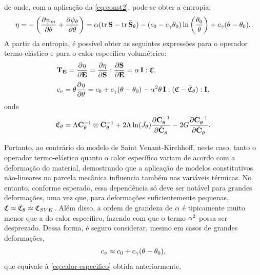 \documentclass[Tese.tex]{subfiles}
\begin{document}
de onde, com a aplicação da \cref{eq:const2}, pode-se obter a entropia:
\begin{equation}
\eta = -\left(\dfrac{\partial\psi_m}{\partial\theta} + \dfrac{\partial\psi_{\theta}}{\partial\theta}\right) = \alpha(\text{tr}\,\mathbf{S}-\text{tr}\,\bar{\mathbf{S}}_{\theta})-(c_0-c_{\gamma}\theta_0)\ln\left(\dfrac{\theta_0}{\theta}\right)+c_{\gamma}(\theta-\theta_0).
\end{equation}
A partir da entropia, é possível obter as seguintes expressões para o operador termo-elástico e para o calor específico volumétrico:
\begin{align}
&\operadorTermoElastico = \dfrac{\partial\entropy}{\partial\E} = \dfrac{\partial\entropy}{\partial\S}:\dfrac{\partial\S}{\partial\E} = \coefExp\,\I:\CC, \\[0.1cm]
&\volumetricHeatCapacity = \temp\dfrac{\partial\entropy}{\partial\temp} %
= \specificHeatIni+\specificHeatConst(\temp - \tempref) - \coefExp^2\temp\,\I:(\CC-\CCtNeg):\I.
\end{align}
onde
\begin{equation}
\bar{\mathfrak{C}}_{\theta} = \Lambda\bar{\mathbf{C}}_{\theta}^{-1}\otimes\bar{\mathbf{C}}_{\theta}^{-1}+2\Lambda\ln(\bar{J}_{\theta})\dfrac{\partial\bar{\mathbf{C}}_{\theta}^{-1}}{\partial\bar{\mathbf{C}}_{\theta}^{\;\;}} - 2G\dfrac{\partial\bar{\mathbf{C}}_{\theta}^{-1}}{\partial\bar{\mathbf{C}}_{\theta}^{\;\;}}.
\end{equation}

Portanto, ao contrário do modelo de Saint Venant-Kirchhoff, neste caso, tanto o operador termo-elástico quanto o calor específico variam de acordo com a deformação do material, demostrando que a aplicação de modelos constitutivos não-lineares na parcela mecânica influencia também nas variáveis térmicas. No entanto, conforme esperado, essa dependência só deve ser notável para grandes deformações, uma vez que, para deformações suficientemente pequenas, $\mathfrak{C} \approx \bar{\mathfrak{C}}_{\theta} \approx \mathfrak{C}_{SVK}$. Além disso, a ordem de grandeza de $\alpha$ é tipicamente muito menor que a do calor específico, fazendo com que o termo $\alpha^2$ possa ser desprezado. Dessa forma, é seguro considerar, mesmo em casos de grandes deformações,
\begin{equation}\label{eq:calor-especifico-nh-aprox}
{c_v} \approx c_0+c_{\gamma}(\theta - \theta_0),
\end{equation}
que equivale à \cref{eq:calor-especifico} obtida anteriormente. 
\end{document}

